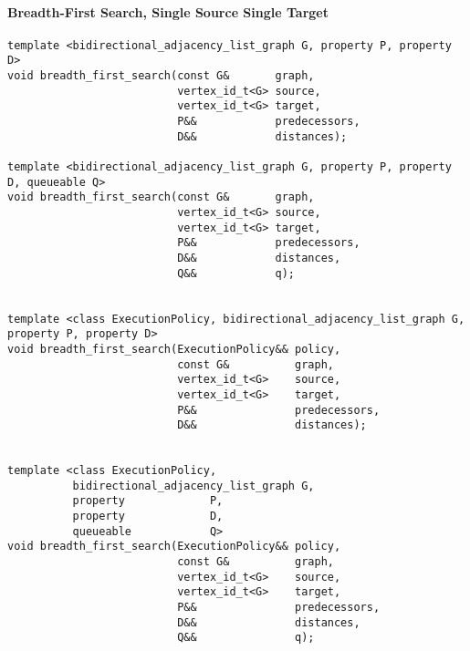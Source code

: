 \paragraph{Breadth-First Search, Single Source Single Target}
\begin{lstlisting}
template <bidirectional_adjacency_list_graph G, property P, property D>
void breadth_first_search(const G&       graph,
                          vertex_id_t<G> source,
                          vertex_id_t<G> target,
                          P&&            predecessors,
                          D&&            distances);

template <bidirectional_adjacency_list_graph G, property P, property D, queueable Q>
void breadth_first_search(const G&       graph,
                          vertex_id_t<G> source,
                          vertex_id_t<G> target,
                          P&&            predecessors,
                          D&&            distances,
                          Q&&            q);


template <class ExecutionPolicy, bidirectional_adjacency_list_graph G, property P, property D>
void breadth_first_search(ExecutionPolicy&& policy,
                          const G&          graph,
                          vertex_id_t<G>    source,
                          vertex_id_t<G>    target,
                          P&&               predecessors,
                          D&&               distances);


template <class ExecutionPolicy,
          bidirectional_adjacency_list_graph G,
          property             P,
          property             D,
          queueable            Q>
void breadth_first_search(ExecutionPolicy&& policy,
                          const G&          graph,
                          vertex_id_t<G>    source,
                          vertex_id_t<G>    target,
                          P&&               predecessors,
                          D&&               distances,
                          Q&&               q);

\end{lstlisting}


